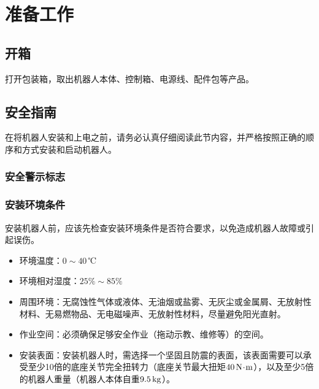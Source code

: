 \chapter{准备工作}
\section{开箱}
打开包装箱，取出机器人本体、控制箱、电源线、配件包等产品。
\vspace*{-6pt}

\section{安全指南}
\label{sec:安全指南}
在将机器人安装和上电之前，请务必认真仔细阅读此节内容，并严格按照正确的顺序和方式安装和启动机器人。

\subsection{安全警示标志}




\subsection{安装环境条件}
安装机器人前，应该先检查安装环境条件是否符合要求，以免造成机器人故障或引起误伤。

\begin{itemize}
\item 环境温度：$0\sim 40\,$℃
\item 环境相对湿度：$25\%\sim 85\%$
\item 周围环境：无腐蚀性气体或液体、无油烟或盐雾、无灰尘或金属屑、无放射性材料、无易燃物品、无电磁噪声、无放射性材料，尽量避免阳光直射。
\item 作业空间：必须确保足够安全作业（拖动示教、维修等）的空间。
\item 安装表面：安装机器人时，需选择一个坚固且防震的表面，该表面需要可以承受至少10倍的底座关节完全扭转力（底座关节最大扭矩$40 \,\mathrm{N\!\cdot\! m}$），以及至少5倍的机器人重量（机器人本体自重$9.5 \,\mathrm{kg}$）。
\end{itemize}


